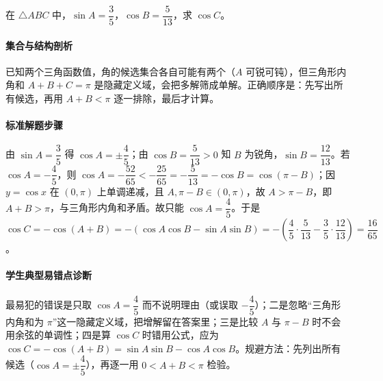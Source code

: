 \begin{problem}
在 $\triangle ABC$ 中，$\sin A=\dfrac35$，$\cos B=\dfrac{5}{13}$，求 $\cos C$。
\end{problem}
\begin{solution}
\paragraph{集合与结构剖析}
已知两个三角函数值，角的候选集合各自可能有两个（$A$ 可锐可钝），但三角形内角和 $A+B+C=\pi$ 是隐藏定义域，会把多解筛成单解。正确顺序是：先写出所有候选，再用 $A+B<\pi$ 逐一排除，最后才计算。
\paragraph{标准解题步骤}
由 $\sin A=\dfrac35$ 得 $\cos A=\pm\dfrac45$；由 $\cos B=\dfrac{5}{13}>0$ 知 $B$ 为锐角，$\sin B=\dfrac{12}{13}$。若 $\cos A=-\dfrac45$，则 $\cos A=-\dfrac{52}{65}<-\dfrac{25}{65}=-\dfrac{5}{13}=-\cos B=\cos(\pi-B)$；因 $y=\cos x$ 在 $(0,\pi)$ 上单调递减，且 $A,\pi-B\in(0,\pi)$，故 $A>\pi-B$，即 $A+B>\pi$，与三角形内角和矛盾。故只能 $\cos A=\dfrac45$。于是 $\cos C=-\cos(A+B)=-(\cos A\cos B-\sin A\sin B)=-\left(\dfrac45\cdot\dfrac{5}{13}-\dfrac35\cdot\dfrac{12}{13}\right)=\dfrac{16}{65}$。
\paragraph{学生典型易错点诊断}
最易犯的错误是只取 $\cos A=\dfrac45$ 而不说明理由（或误取 $-\dfrac45$）；二是忽略“三角形内角和为 $\pi$”这一隐藏定义域，把增解留在答案里；三是比较 $A$ 与 $\pi-B$ 时不会用余弦的单调性；四是算 $\cos C$ 时错用公式，应为 $\cos C=-\cos(A+B)=\sin A\sin B-\cos A\cos B$。规避方法：先列出所有候选（$\cos A=\pm\dfrac45$），再逐一用 $0<A+B<\pi$ 检验。
\end{solution}

